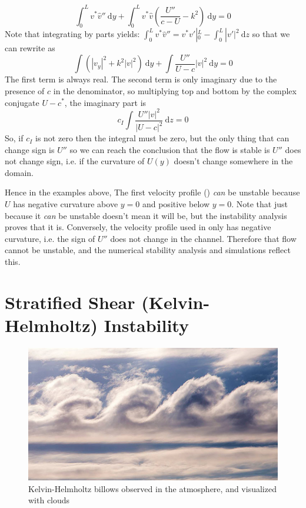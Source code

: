 \documentclass[11pt]{article}
\begin{document}
\begin{equation}
    \int_{0}^L v^{*}\hat{v}'' \ \mathrm{d}y +  \int_{0}^L
v^{*}\hat{v}\left(\frac{U''}{c-U} - k^2 \right) \ \mathrm{d}y  = 0
\end{equation} 
Note that integrating by parts yields: $\int_{0}^L v^{*}\hat{v}''  =
v^{*}v'|^{L}_0 - \int_{0}^L |v'|^2\ \mathrm{d}z$ so that we can rewrite as 
\begin{equation}
    \int \left(|v_y|^2  + k^2|v|^2 \right)\ \mathrm{d}y + \int \frac{U''}{U-c}
|v|^2 \ \mathrm{d}y = 0
\end{equation}
The first term is always real.  The second term is only imaginary due to the
presence of $c$ in the denominator, so multiplying top and bottom by the
complex conjugate $U-c^*$, the imaginary part is
\begin{equation}
    c_{I}\int \frac{U'' |v|^2}{|U-c|^2}\ \mathrm{d}z = 0
\end{equation}
So, if $c_I$ is not zero then the integral must be zero, but the only thing
that can change sign is $U''$ so we can reach the conclusion that the flow is
stable is $U''$ does not change sign, i.e. if the curvature of $U(y)$ doesn't
change somewhere in the domain.  


Hence in the examples above, The first velocity profile
() \emph{can} be unstable because $U$ has negative
curvature above $y=0$ and positive below $y=0$.  Note that just because it
\emph{can} be unstable doesn't mean it will be, but the instability analysis
proves that it is.  Conversely, the velocity profile used in
 only has negative curvature, i.e. the sign
of $U''$ does not change in the channel.  Therefore that flow cannot be
unstable, and the numerical stability analysis and simulations reflect this. 



\section{Stratified Shear (Kelvin-Helmholtz) Instability}

\begin{figure}
\begin{center}
  \includegraphics[width=4.5in]{images/KHBillows}  
\end{center}
\caption{Kelvin-Helmholtz billows observed in the atmosphere, and visualized
with clouds}
\end{figure}
\end{document}
